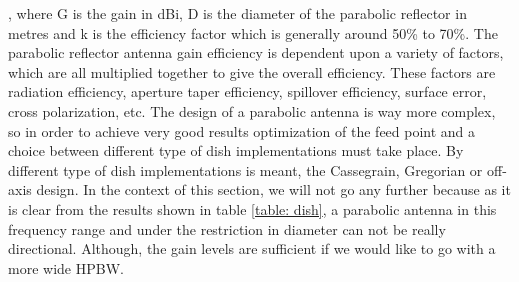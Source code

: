 , where G is the gain in dBi, D is the diameter of the parabolic reflector in metres and k is the efficiency factor which is generally around 50\% to 70\%. The parabolic reflector antenna gain efficiency is dependent upon a variety of factors, which are all multiplied together to give the overall efficiency. These factors are radiation efficiency, aperture taper efficiency, spillover efficiency, surface error, cross polarization, etc. The design of a parabolic antenna is way more complex, so in order to achieve very good results optimization of the feed point and a choice between different type of dish implementations must take place. By different type of dish implementations is meant, the Cassegrain, Gregorian or off-axis design. In the context of this section, we will not go any further because as it is clear from the results shown in table \ref{table: dish}, a parabolic antenna in this frequency range and under the restriction in diameter can not be really directional. Although, the gain levels are sufficient if we would like to go with a more wide HPBW.  